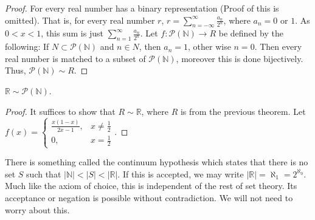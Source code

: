             \begin{proof}
            For every real number has a binary representation (Proof of this is omitted). That is, for every real number $r$, $ r = \sum_{n=-\infty}^{\infty} \frac{a_n}{2^n}$, where $a_n = 0$ or $1$. As $0<x<1$, this sum is just $\sum_{n=1}^{\infty} \frac{a_n}{2^n}$. Let $f:\mathcal{P}(\mathbb{N})\rightarrow R$ be defined by the following: If $N\subset \mathcal{P}(\mathbb{N})$ and $n\in N$, then $a_n = 1$, other wise $n=0$. Then every real number is matched to a subset of $\mathcal{P}(\mathbb{N})$, moreover this is done bijectively. Thus, $\mathcal{P}(\mathbb{N})\sim R$.
            \end{proof}
            \begin{theorem}
            $\mathbb{R} \sim \mathcal{P}(\mathbb{N})$.
            \end{theorem}
            \begin{proof}
            It suffices to show that $R\sim \mathbb{R}$, where $R$ is from the previous theorem. Let $f(x) = \begin{cases} \frac{x(1-x)}{2x-1}, & x \ne \frac{1}{2} \\ 0, & x = \frac{1}{2}\end{cases}$.
            \end{proof}
            \begin{remark}
            There is something called the continuum hypothesis which states that there is no set $S$ such that $|\mathbb{N}| < |S| < |\mathbb{R}|$. If this is accepted, we may write $|\mathbb{R}| = \aleph_1 = 2^{\aleph_0}$. Much like the axiom of choice, this is independent of the rest of set theory. Its acceptance or negation is possible without contradiction. We will not need to worry about this.
            \end{remark}